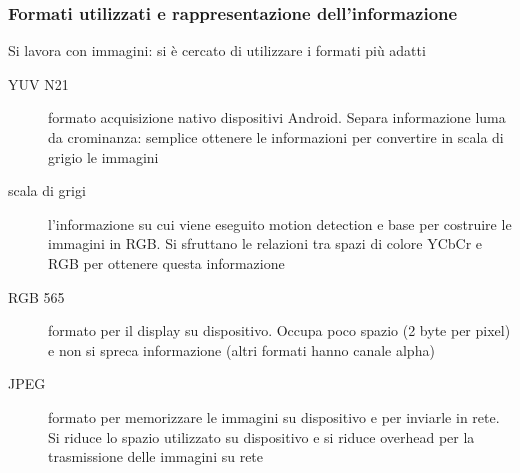 \documentclass{beamer}
\begin{document}
\begin{frame}
\frametitle{Formati utilizzati e rappresentazione dell'informazione}
Si lavora con immagini: si è cercato di utilizzare i formati più adatti
\begin{description}
  \item[YUV N21] formato acquisizione nativo dispositivi Android. Separa informazione luma da crominanza: semplice ottenere le informazioni per convertire in scala di grigio le immagini
  \item[scala di grigi] l'informazione su cui viene eseguito motion detection e base per costruire le immagini in RGB. Si sfruttano le relazioni tra spazi di colore YCbCr e RGB per ottenere questa informazione
  \item[RGB 565] formato per il display su dispositivo. Occupa poco spazio (2 byte per pixel) e non si spreca informazione (altri formati hanno canale alpha)
  \item[JPEG] formato per memorizzare le immagini su dispositivo e per inviarle in rete. Si riduce lo spazio utilizzato su dispositivo e si riduce overhead per la trasmissione delle immagini su rete
\end{description}
\end{frame}
\end{document}
